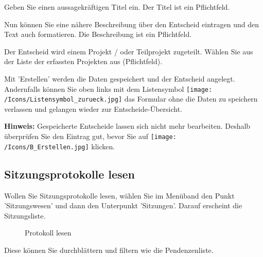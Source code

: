 \begin{compactitem}
	\item Geben Sie einen aussagekräftigen Titel ein. Der Titel ist ein Pflichtfeld.
	\item Nun können Sie eine nähere Beschreibung über den Entscheid eintragen und den Text auch formatieren. Die Beschreibung ist ein Pflichtfeld.
	\item Der Entscheid wird einem Projekt / oder Teilprojekt zugeteilt. Wählen Sie aus der Liste der erfassten Projekten aus (Pflichtfeld).
	\item Mit 'Erstellen' werden die Daten gespeichert und der Entscheid angelegt. Andernfalls können Sie oben links mit dem Listensymbol \texttt{[image: /Icons/Listensymbol\_zurueck.jpg]} das Formular ohne die Daten zu speichern verlassen und gelangen wieder zur Entscheide-Übersicht.
\end{compactitem}

\vspace{\baselineskip}

\textbf{Hinweis:} Gespeicherte Entscheide lassen sich nicht mehr bearbeiten. Deshalb überprüfen Sie den Eintrag gut, bevor Sie auf \texttt{[image: /Icons/B\_Erstellen.jpg]} klicken.

\clearpage

\subsection{Sitzungsprotokolle lesen}

Wollen Sie Sitzungsprotokolle lesen, wählen Sie im Menüband den Punkt 'Sitzungswesen' und dann den Unterpunkt 'Sitzungen'. Darauf erscheint die Sitzungsliste.

\begin{figure}[H]
\caption{Protokoll lesen}
\end{figure}

Diese können Sie durchblättern und filtern wie die Pendenzenliste.

